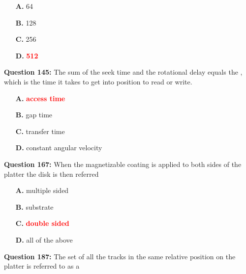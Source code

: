 \documentclass[12pt,a4paper]{article}
\begin{document}
\begin{itemize}
    \item[\textbf{A.}] 64
    \item[\textbf{B.}] 128
    \item[\textbf{C.}] 256
    \item[\textbf{D.}] \textcolor{red}{\textbf{512}}
\end{itemize}

\vspace{0.5cm}

\vspace{0.5cm}

\textbf{Question 145:} The sum of the seek time and the rotational delay equals the \underline{\hspace{1.5cm}}, which is the time it takes to get into position to read or write.

\begin{itemize}
    \item[\textbf{A.}] \textcolor{red}{\textbf{access time}}
    \item[\textbf{B.}] gap time
    \item[\textbf{C.}] transfer time
    \item[\textbf{D.}] constant angular velocity
\end{itemize}

\vspace{0.5cm}

\vspace{0.5cm}

\textbf{Question 167:} When the magnetizable coating is applied to both sides of the platter the disk is then referred

\begin{itemize}
    \item[\textbf{A.}] multiple sided
    \item[\textbf{B.}] substrate
    \item[\textbf{C.}] \textcolor{red}{\textbf{double sided}}
    \item[\textbf{D.}] all of the above
\end{itemize}

\vspace{0.5cm}

\vspace{0.5cm}

\textbf{Question 187:} The set of all the tracks in the same relative position on the platter is referred to as a \underline{\hspace{1.5cm}}
\end{document}
